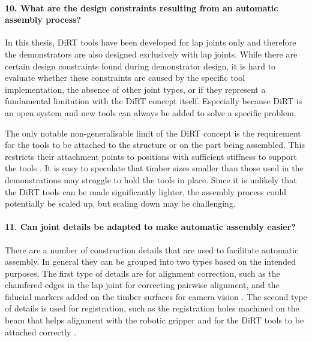\paragraph{10. What are the design constraints resulting from an automatic assembly process?}

In this thesis, DiRT tools have been developed for lap joints only and therefore the demonstrators are also designed exclusively with lap joints. While there are certain design constraints found during demonstrator design, it is hard to evaluate whether these constraints are caused by the specific tool implementation, the absence of other joint types, or if they represent a fundamental limitation with the DiRT concept itself. Especially because DiRT is an open system and new tools can always be added to solve a specific problem.

The only notable non-generalisable limit of the DiRT concept is the requirement for the tools to be attached to the structure or on the part being assembled. This restricts their attachment points to positions with sufficient stiffness to support the tools . It is easy to speculate that timber sizes smaller than those used in the demonstrations may struggle to hold the tools in place. Since it is unlikely that the DiRT tools can be made significantly lighter, the assembly process could potentially be scaled up, but scaling down may be challenging.

\paragraph{11. Can joint details be adapted to make automatic assembly easier?}

There are a number of construction details that are used to facilitate automatic assembly. In general they can be grouped into two types based on the intended purposes. The first type of details are for alignment correction, such as the chamfered edges in the lap joint for correcting pairwise alignment, and the fiducial markers added on the timber surfaces for camera vision . The second type of details is used for registration, such as the registration holes machined on the beam that helps alignment with the robotic gripper and for the DiRT tools to be attached correctly .

